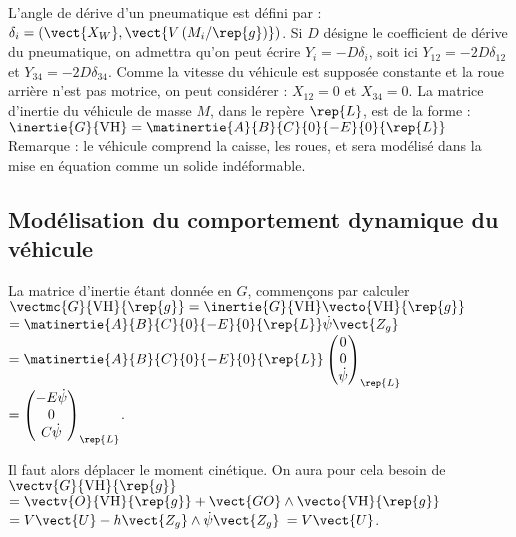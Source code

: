 \begin{multicols}{2}
L’angle de dérive d’un pneumatique est défini par : $\delta_i=\left(\vect{X_W},\vect{V\left(M_i / \rep{g} \right)}\right)$. Si
$D$ désigne le coefficient de dérive du pneumatique, on admettra qu’on peut écrire $Y_i = - D\delta_i$, soit ici $Y_{12}=-2D\delta_{12}$ et $Y_{34}=-2D\delta_{34}$.
Comme la vitesse du véhicule est supposée constante et la roue arrière n’est pas motrice, on peut considérer : $X_{12}=0$ et $X_{34}=0$.
La matrice d’inertie du véhicule de masse $M$, dans le repère $\rep{L}$, est de la
forme : $\inertie{G}{\text{VH}}=\matinertie{A}{B}{C}{0}{-E}{0}{\rep{L}}$
Remarque : le véhicule comprend la caisse, les roues, et sera modélisé
dans la mise en équation comme un solide indéformable.
\fi

\subsection*{Modélisation du comportement dynamique du véhicule}

\ifprof
\begin{corrige}

La matrice d'inertie étant donnée en $G$, commençons par calculer 
$\vectmc{G}{\text{VH}}{\rep{g}} = \inertie{G}{\text{VH}} \vecto{\text{VH}}{\rep{g}} $
$ =\matinertie{A}{B}{C}{0}{-E}{0}{\rep{L}} \dot{\psi}\vect{Z_g} $
$ =\matinertie{A}{B}{C}{0}{-E}{0}{\rep{L}} \begin{pmatrix} 0 \\ 0 \\ \dot{\psi} \end{pmatrix}_{\rep{L}} $
$ =  \begin{pmatrix} -E\dot{\psi} \\ 0 \\ C\dot{\psi} \end{pmatrix}_{\rep{L}} $.

Il faut alors déplacer le moment cinétique. On aura pour cela besoin de $\vectv{G}{\text{VH}}{\rep{g}} $
$= \vectv{O}{\text{VH}}{\rep{g}} + \vect{GO}\wedge  \vecto{\text{VH}}{\rep{g}}$
$ = V\vect{U}-h\vect{Z_g} \wedge  \dot{\psi}\vect{Z_g} $
$ = V\vect{U}$.


\end{corrige}
\end{multicols}
